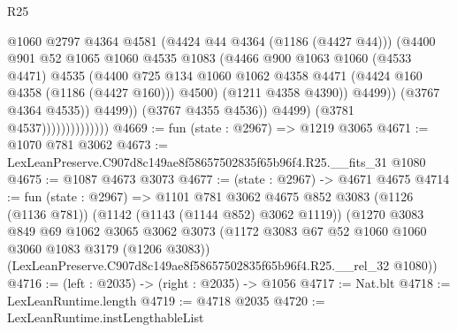 \begin{lexlean}{R25}
\begin{coremodule}
                                          @1060
                                          @2797
                                          @4364
                                          @4581
                                          (@4424 @44 @4364 (@1186 (@4427 @44)))
                                          (@4400
                                            @901
                                            @52
                                            @1065
                                            @1060
                                            @4535
                                            @1083
                                            (@4466
                                              @900
                                              @1063
                                              @1060
                                              (@4533 @4471)
                                              @4535
                                              (@4400
                                                @725
                                                @134
                                                @1060
                                                @1062
                                                @4358
                                                @4471
                                                (@4424 @160 @4358 (@1186 (@4427 @160)))
                                                @4500)
                                              (@1211 @4358 @4390))
                                            @4499))
                                        (@3767 @4364 @4535))
                                      @4499))
                                  (@3767 @4355 @4536))
                                @4499)
                              (@3781 @4537))))))))))))))
@4669 := fun (state : @2967) => @1219 @3065
@4671 := @1070 @781 @3062
@4673 := LexLeanPreserve.C907d8c149ae8f58657502835f65b96f4.R25.__fits_31 @1080
@4675 := @1087 @4673 @3073
@4677 := (state : @2967) -> @4671 @4675
@4714 := fun (state : @2967) =>
  @1101
    @781
    @3062
    @4675
    @852
    @3083
    (@1126 (@1136 @781))
    (@1142 (@1143 (@1144 @852) @3062 @1119))
    (@1270
      @3083
      @849
      @69
      @1062
      @3065
      @3062
      @3073
      (@1172 @3083 @67 @52 @1060 @1060 @3060 @1083 @3179 (@1206 @3083))
      (LexLeanPreserve.C907d8c149ae8f58657502835f65b96f4.R25.__rel_32 @1080))
@4716 := (left : @2035) -> (right : @2035) -> @1056
@4717 := Nat.blt
@4718 := LexLeanRuntime.length
@4719 := @4718 @2035
@4720 := LexLeanRuntime.instLengthableList

\end{coremodule}
\end{lexlean}
